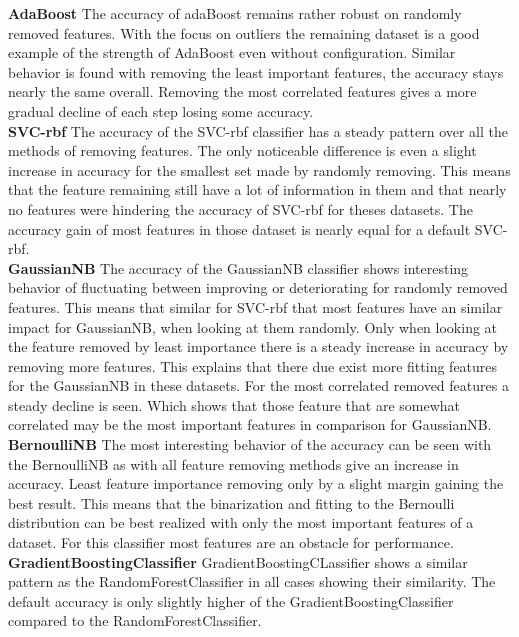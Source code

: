 \documentclass[a4paper,10pt]{article}
\begin{document}
\textbf{AdaBoost} The accuracy of adaBoost remains rather robust on randomly removed features. With the focus on outliers the remaining dataset is a good example of the strength of AdaBoost even without configuration. Similar behavior is found with removing the least important features, the accuracy stays nearly the same overall. Removing the most correlated features gives a more gradual decline of each step losing some accuracy.   \\

\textbf{SVC-rbf} The accuracy of the SVC-rbf classifier has a steady pattern over all the methods of removing features. The only noticeable difference is even a slight increase in accuracy for the smallest set made by randomly removing. This means that the feature remaining still have a lot of information in them and that nearly no features were hindering the accuracy of SVC-rbf for theses datasets. The accuracy gain of most features in those dataset is nearly equal for a default SVC-rbf.   \\

\textbf{GaussianNB} The accuracy of the GaussianNB classifier shows interesting behavior of fluctuating between improving or deteriorating for randomly removed features. This means that similar for SVC-rbf that most features have an similar impact for GaussianNB, when looking at them randomly. Only when looking at the feature removed by least importance there is a steady increase in accuracy by removing more features. This explains that there due exist more fitting features for the GaussianNB in these datasets. For the most correlated removed features a steady decline is seen. Which shows that those feature that are somewhat correlated may be the most important features in comparison for GaussianNB. \\

\textbf{BernoulliNB} The most interesting behavior of the accuracy can be seen with the BernoulliNB as with all feature removing methods give an increase in accuracy. Least feature importance removing only by a slight margin gaining the best result. This means that the binarization and fitting to the Bernoulli distribution can be best realized with only the most important features of a dataset. For this classifier most features are an obstacle for performance. \\

\textbf{GradientBoostingClassifier} GradientBoostingCLassifier shows a similar pattern as the RandomForestClassifier in all cases showing their similarity. The default accuracy is only slightly higher of the GradientBoostingClassifier compared to the RandomForestClassifier. \\
\end{document}
